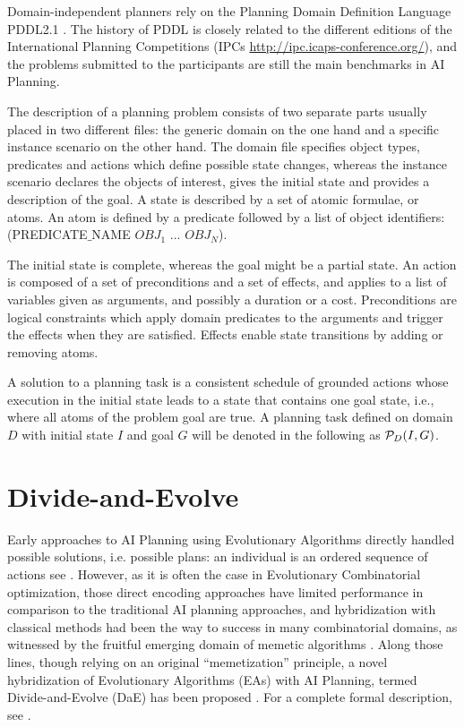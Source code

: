\documentclass{MYsig-alternate}
\begin{document}
Domain-independent planners rely on the Planning Domain Definition Language PDDL2.1 \cite{Fox-JAIR-2003}. The history of PDDL is closely related to the different editions of the International Planning Competitions (IPCs \url{http://ipc.icaps-conference.org/}), and the problems submitted to the participants are still the main benchmarks in AI Planning.

The description of a planning problem consists of two separate parts usually placed in two different files: the generic domain on the one hand and a specific instance scenario on the other hand. The domain file specifies object types, predicates and actions which define possible state changes, whereas the instance scenario declares the objects of interest, gives the initial state and provides a description of the goal. A state is described by a set of atomic formulae, or atoms. An atom is defined by a predicate followed by a list of object identifiers: (PREDICATE$\_$NAME $OBJ_1$ ... $OBJ_N$). 

The initial state is complete, whereas the goal might be a partial state. An action is composed of a set of preconditions and a set of effects, and applies to a list of variables given as arguments, and possibly a duration or a cost. Preconditions are logical constraints which apply domain predicates to the arguments and trigger the effects when they are satisfied. Effects enable state transitions by adding or removing atoms.

A solution to a planning task is a consistent schedule of grounded actions whose execution in the initial state leads to a state that contains one goal state, i.e., where all atoms of the problem goal are true. A planning task defined on domain $D$ with initial state $I$ and goal $G$ will be denoted in the following as ${\cal P}_D(I,G)$.

\section{Divide-and-Evolve}

\label{section:dae}

Early approaches to AI Planning using Evolutionary Algorithms directly handled possible solutions, i.e. possible plans: an individual is an ordered sequence of actions see \cite{Spector-AAAI-94,muslea97,westerberg:2000,westerberg:2001,Morignot-2005}. However, as it is often the case in Evolutionary Combinatorial optimization, those direct encoding approaches have limited performance in comparison to the traditional AI planning approaches, and hybridization with classical methods had been the way to success in many combinatorial domains, as witnessed by the fruitful emerging domain of memetic algorithms \cite{MemeticBook:2005}. Along those lines, though relying on an original ``memetization'' principle, a novel hybridization of Evolutionary Algorithms (EAs) with AI Planning, termed Divide-and-Evolve (DaE) has been proposed \cite{DAE:EvoCOP06,DAE:book-2007}. For a complete formal description, see \cite{Bibai:ICAPS2010}.
\end{document}
